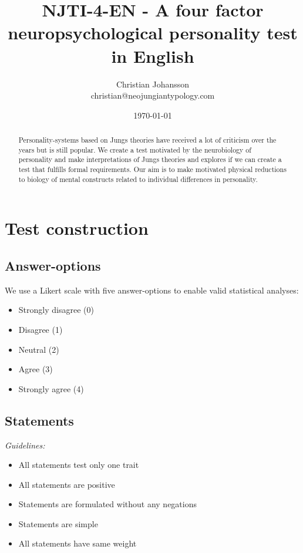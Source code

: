 \documentclass[11pt,a4paper]{article}
\begin{document}
\title{NJTI-4-EN - A four factor neuropsychological personality test in English}
\author{Christian Johansson\\
christian@neojungiantypology.com}
\date{\today}
\maketitle

\begin{abstract}
Personality-systems based on Jungs theories have received a lot of criticism over the years but is still popular. We create a test motivated by the neurobiology of personality and make interpretations of Jungs theories and explores if we can create a test that fulfills formal requirements.
Our aim is to make motivated physical reductions to biology of mental constructs related to individual differences in personality.
\end{abstract}

\section{Test construction}

\subsection{Answer-options}
We use a Likert scale with five answer-options to enable valid statistical analyses:
\begin{itemize}
  \item Strongly disagree (0)
  \item Disagree (1)
  \item Neutral (2)
  \item Agree (3)
  \item Strongly agree (4)
\end{itemize}

\subsection{Statements}
\emph{Guidelines:}
\begin{itemize}
\item All statements test only one trait
\item All statements are positive
\item Statements are formulated without any negations
\item Statements are simple
\item All statements have same weight
\end{itemize}
\end{document}
